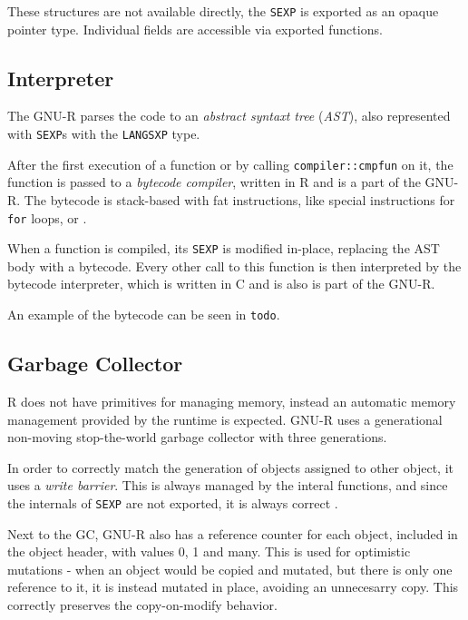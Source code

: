 These structures are not available directly, the \texttt{SEXP} is exported as an opaque pointer type. Individual fields are accessible via exported functions.

\subsection*{Interpreter}

The GNU-R parses the code to an \textit{abstract syntaxt tree} (\textit{AST}), also represented with \texttt{SEXP}s with the \texttt{LANGSXP} type.

After the first execution of a function or by calling \texttt{compiler::cmpfun} on it, the function is passed to a \textit{bytecode compiler}, written in R and is a part of the GNU-R. The bytecode is stack-based with fat instructions, like special instructions for \texttt{for} loops, or \todo{\dots}.

When a function is compiled, its \texttt{SEXP} is modified in-place, replacing the AST body with a bytecode. Every other call to this function is then interpreted by the bytecode interpreter, which is written in C and is also is part of the GNU-R.

An example of the bytecode can be seen in \texttt{todo}.

\subsection*{Garbage Collector}
R does not have primitives for managing memory, instead an automatic memory management provided by the runtime is expected. GNU-R uses a generational non-moving stop-the-world garbage collector with three generations\todocite.

In order to correctly match the generation of objects assigned to other object, it uses a \textit{write barrier}\todocite. This is always managed by the interal functions, and since the internals of \texttt{SEXP} are not exported, it is always correct .

Next to the GC, GNU-R also has a reference counter for each object, included in the object header, with values 0, 1 and many. This is used for optimistic mutations - when an object would be copied and mutated, but there is only one reference to it, it is instead mutated in place, avoiding an unnecesarry copy. This correctly preserves the copy-on-modify behavior.

